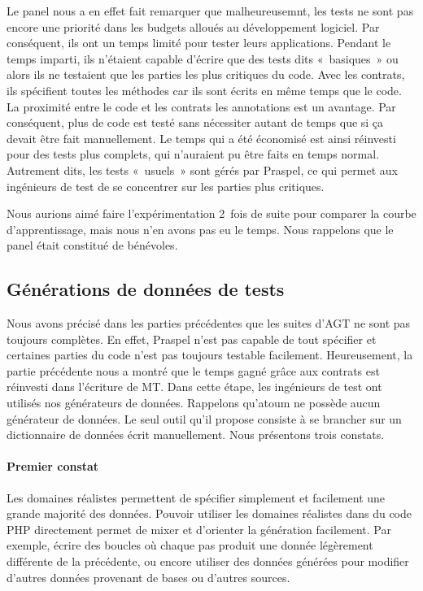 Le panel nous a en effet fait remarquer que malheureusemnt, les tests ne sont
pas encore une priorité dans les budgets alloués au développement logiciel. Par
conséquent, ils ont un temps limité pour tester leurs applications. Pendant le
temps imparti, ils n'étaient capable d'écrire que des tests dits «~basiques~» ou
alors ils ne testaient que les parties les plus critiques du code. Avec les
contrats, ils spécifient toutes les méthodes car ils sont écrits en même temps
que le code. La proximité entre le code et les contrats \via les annotations est
un avantage. Par conséquent, plus de code est testé sans nécessiter autant de
temps que si ça devait être fait manuellement. Le temps qui a été économisé est
ainsi réinvesti pour des tests plus complets, qui n'auraient pu être faits en
temps normal. Autrement dits, les tests «~usuels~» sont gérés par Praspel, ce
qui permet aux ingénieurs de test de se concentrer sur les parties plus
critiques.

Nous aurions aimé faire l'expérimentation 2~fois de suite pour comparer la
courbe d'apprentissage, mais nous n'en avons pas eu le temps. Nous rappelons que
le panel était constitué de bénévoles.

\subsection{Générations de données de tests}
\label{subsection:experimentation:data}
%

Nous avons précisé dans les parties précédentes que les suites d'AGT ne sont pas
toujours complètes. En effet, Praspel n'est pas capable de tout spécifier et
certaines parties du code n'est pas toujours testable facilement. Heureusement,
la partie précédente nous a montré que le temps gagné grâce aux contrats est
réinvesti dans l'écriture de MT. Dans cette étape, les ingénieurs de test ont
utilisés nos générateurs de données. Rappelons qu'atoum ne possède aucun
générateur de données. Le seul outil qu'il propose consiste à se brancher sur un
dictionnaire de données écrit manuellement. Nous présentons trois constats.

\paragraph{Premier constat} Les domaines réalistes permettent de spécifier
simplement et facilement une grande majorité des données. Pouvoir utiliser les
domaines réalistes dans du code PHP directement permet de mixer et d'orienter la
génération facilement. Par exemple, écrire des boucles où chaque pas produit une
donnée légèrement différente de la précédente, ou encore utiliser des données
générées pour modifier d'autres données provenant de bases ou d'autres sources.


